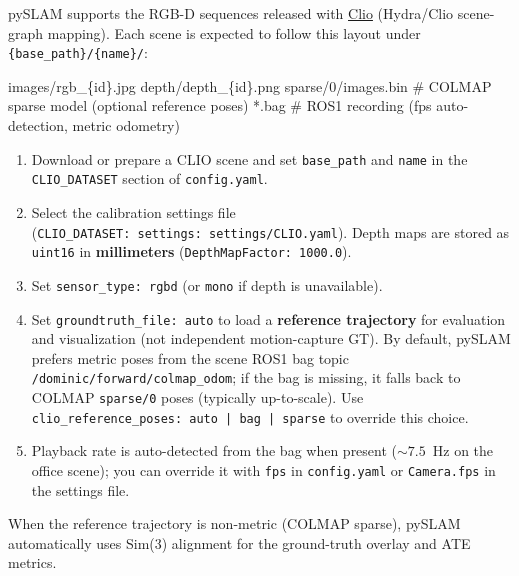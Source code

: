 \documentclass{article}
\newenvironment{Shaded}{\begin{snugshade}}{\end{snugshade}}
\newcommand{\NormalTok}[1]{\textcolor[rgb]{0.74,0.68,0.62}{#1}}
\providecommand{\tightlist}{%
  \setlength{\itemsep}{0pt}\setlength{\parskip}{0pt}}
\begin{document}
pySLAM supports the RGB-D sequences released with
\href{https://github.com/MIT-SPARK/Clio}{Clio} \cite{kim2024clio}
(Hydra/Clio scene-graph mapping). Each scene is expected to follow this
layout under \texttt{\{base\_path\}/\{name\}/}:

\begin{scriptsize}
\begin{Shaded}
\begin{Highlighting}[]
\NormalTok{images/rgb\_\{id\}.jpg}
\NormalTok{depth/depth\_\{id\}.png}
\NormalTok{sparse/0/images.bin          \# COLMAP sparse model (optional reference poses)}
\NormalTok{*.bag                        \# ROS1 recording (fps auto-detection, metric odometry)}
\end{Highlighting}
\end{Shaded}
\end{scriptsize}

\begin{enumerate}
\def\labelenumi{\arabic{enumi}.}
\tightlist
\item
  Download or prepare a CLIO scene and set \texttt{base\_path} and
  \texttt{name} in the \texttt{CLIO\_DATASET} section of
  \texttt{config.yaml}.
\item
  Select the calibration settings file (\texttt{CLIO\_DATASET:\ settings:\
  settings/CLIO.yaml}). Depth maps are stored as \texttt{uint16} in
  \textbf{millimeters} (\texttt{DepthMapFactor:\ 1000.0}).
\item
  Set \texttt{sensor\_type:\ rgbd} (or \texttt{mono} if depth is
  unavailable).
\item
  Set \texttt{groundtruth\_file:\ auto} to load a \textbf{reference
  trajectory} for evaluation and visualization (not independent
  motion-capture GT). By default, pySLAM prefers metric poses from the
  scene ROS1 bag topic \texttt{/dominic/forward/colmap\_odom}; if the
  bag is missing, it falls back to COLMAP \texttt{sparse/0} poses
  (typically up-to-scale). Use \texttt{clio\_reference\_poses:\ auto\ |\ bag\ |\ sparse}
  to override this choice.
\item
  Playback rate is auto-detected from the bag when present
  (${\sim}7.5$~Hz on the office scene); you can override it with
  \texttt{fps} in \texttt{config.yaml} or \texttt{Camera.fps} in the
  settings file.
\end{enumerate}

When the reference trajectory is non-metric (COLMAP sparse), pySLAM
automatically uses Sim(3) alignment for the ground-truth overlay and ATE
metrics.
\end{document}
